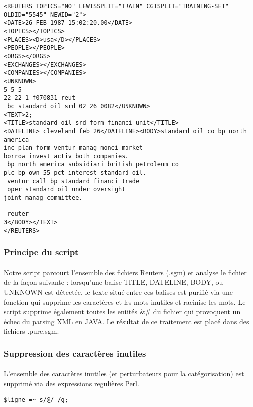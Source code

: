 \lstset{language=XML}
\begin{lstlisting}
<REUTERS TOPICS="NO" LEWISSPLIT="TRAIN" CGISPLIT="TRAINING-SET" OLDID="5545" NEWID="2">
<DATE>26-FEB-1987 15:02:20.00</DATE>
<TOPICS></TOPICS>
<PLACES><D>usa</D></PLACES>
<PEOPLE></PEOPLE>
<ORGS></ORGS>
<EXCHANGES></EXCHANGES>
<COMPANIES></COMPANIES>
<UNKNOWN> 
5 5 5 
22 22 1 f070831 reut
 bc standard oil srd 02 26 0082</UNKNOWN>
<TEXT>2;
<TITLE>standard oil srd form financi unit</TITLE>
<DATELINE> cleveland feb 26</DATELINE><BODY>standard oil co bp north america
inc plan form ventur manag monei market
borrow invest activ both companies.
 bp north america subsidiari british petroleum co
plc bp own 55 pct interest standard oil.
 ventur call bp standard financi trade
 oper standard oil under oversight 
joint manag committee.

 reuter
3</BODY></TEXT>
</REUTERS>
\end{lstlisting}

\subsubsection{Principe du script}
\paragraph{}
Notre script parcourt l'ensemble des fichiers Reuters (.sgm) et analyse le fichier de la façon suivante : lorsqu'une balise TITLE, DATELINE, BODY, ou UNKNOWN est détectée, le texte situé entre ces balises est purifié via une fonction qui supprime les caractères et les mots inutiles et racinise les mots. Le script supprime également toutes les entités \&\# du fichier qui provoquent un échec du parsing XML en JAVA. Le résultat de ce traitement est placé dans des fichiers .pure.sgm.

\subsubsection{Suppression des caractères inutiles}
\paragraph{}
L'ensemble des caractères inutiles (et perturbateurs pour la catégorisation) est supprimé via des expressions regulières Perl.

\lstset{language=Perl}
\begin{lstlisting}
$ligne =~ s/@/ /g;
\end{lstlisting}

